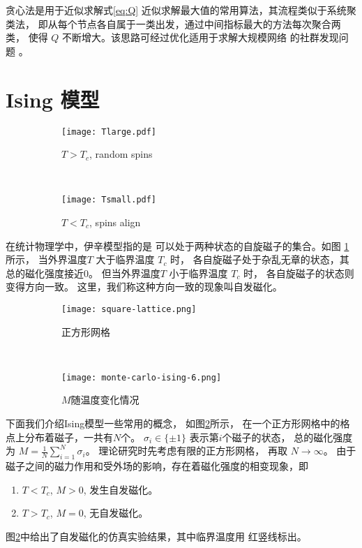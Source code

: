 贪心法是用于近似求解式\eqref{eq:Q}
近似求解最大值的常用算法，其流程类似于系统聚类法，
即从每个节点各自属于一类出发，通过中间指标最大的方法每次聚合两类，
使得 $Q$ 不断增大。该思路可经过优化适用于求解大规模网络
的社群发现问题 \cite{clauset2004finding}。


\section{Ising 模型}\label{sec:ising}
\begin{figure}
	\centering
	\begin{subfigure}{0.5\textwidth}
		\texttt{[image: Tlarge.pdf]}
		\caption{$T>T_c$, random spins}
	\end{subfigure}~
	\begin{subfigure}{0.5\textwidth}
		\texttt{[image: Tsmall.pdf]}
		\caption{$T<T_c$, spins align}
	\end{subfigure}
  \caption{}\label{fig:ising_two_configurations}
\end{figure}    

在统计物理学中，伊辛模型指的是
可以处于两种状态的自旋磁子的集合。如图
\ref{fig:ising_two_configurations} 所示，
当外界温度$T$
大于临界温度 $T_c$ 时，
各自旋磁子处于杂乱无章的状态，其总的磁化强度接近0。
但当外界温度$T$
小于临界温度 $T_c$ 时，
各自旋磁子的状态则变得方向一致。
这里，我们称这种方向一致的现象叫自发磁化。

\begin{figure}
	\centering
	\begin{subfigure}{0.45\textwidth}
		\texttt{[image: square-lattice.png]}
		\caption{正方形网格}\label{fig:square_lattice}
	\end{subfigure}~
	\begin{subfigure}{0.53\textwidth}
		\texttt{[image: monte-carlo-ising-6.png]}
		\caption{$M$随温度变化情况}
	\end{subfigure}
  \caption{}
\end{figure}

下面我们介绍Ising模型一些常用的概念，
如图\ref{fig:square_lattice}所示，
在一个正方形网格中的格点上分布着磁子，一共有$N$个。
$\sigma_i \in \{ \pm 1\} $ 表示第$i$个磁子的状态，
总的磁化强度为 $M = \frac{1}{N} \sum_{i=1}^N \sigma_i$。
理论研究时先考虑有限的正方形网格， 再取 $N\to \infty$。
由于磁子之间的磁力作用和受外场的影响，存在着磁化强度的相变现象，即
\begin{enumerate}
		\item $T< T_c$, $M>0$, 发生自发磁化。
		\item $T> T_c$, $M=0$, 无自发磁化。
\end{enumerate}
图\ref{fig:square_lattice}中给出了自发磁化的仿真实验结果，其中临界温度用
红竖线标出。

